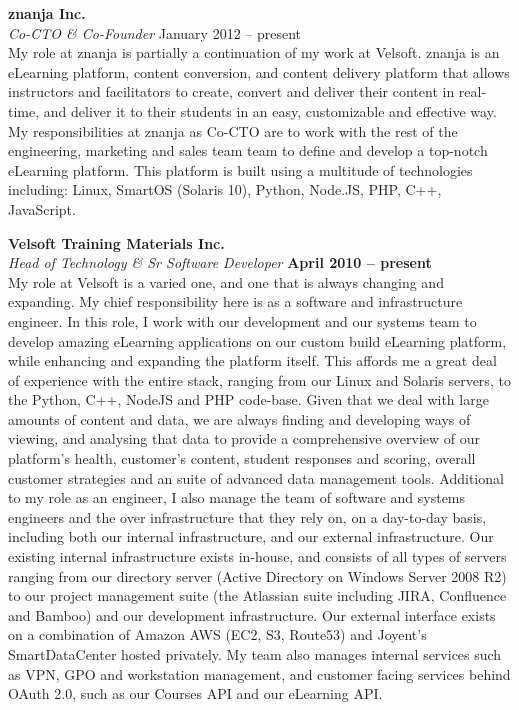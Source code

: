 \documentclass[margin,line]{resume}
\begin{document}
\begin{resume}
	{\bf znanja Inc.} \vspace{2mm}\\\vspace{1mm}
	{\sl Co-CTO \& Co-Founder} \hfill {January 2012 -- present}
	\\
		My role at znanja is partially a continuation of my work at Velsoft. znanja is an eLearning platform, content conversion, and content delivery platform that allows instructors and facilitators to create, convert and deliver their content in real-time, and deliver it to their students in an easy, customizable and effective way. My responsibilities at znanja as Co-CTO are to work with the rest of the engineering, marketing and sales team team to define and develop a top-notch eLearning platform. This platform is built using a multitude of technologies including: Linux, SmartOS (Solaris 10), Python, Node.JS, PHP, C++, JavaScript.

	{\bf Velsoft Training Materials Inc.} \vspace{2mm}\\\vspace{1mm}
	{\sl Head of Technology \& Sr Software Developer} \hfill {\bf April 2010 -- present}
	\\
		My role at Velsoft is a varied one, and one that is always changing and expanding. My chief responsibility here is as a software and infrastructure engineer. In this role, I work with our development and our systems team to develop amazing eLearning applications on our custom build eLearning platform, while enhancing and expanding the platform itself. This affords me a great deal of experience with the entire stack, ranging from our Linux and Solaris servers, to the Python, C++, NodeJS and PHP code-base. Given that we deal with large amounts of content and data, we are always finding and developing ways of viewing, and analysing that data to provide a comprehensive overview of our platform's health, customer's content, student responses and scoring, overall customer strategies and an suite of advanced data management tools.
\newpage
		Additional to my role as an engineer, I also manage the team of software and systems engineers and the over infrastructure that they rely on, on a day-to-day basis, including both our internal infrastructure, and our external infrastructure. Our existing internal infrastructure exists in-house, and consists of all types of servers ranging from our directory server (Active Directory on Windows Server 2008 R2) to our project management suite (the Atlassian suite including JIRA, Confluence and Bamboo) and our development infrastructure. Our external interface exists on a combination of Amazon AWS (EC2, S3, Route53) and Joyent's SmartDataCenter hosted privately. My team also manages internal services such as VPN, GPO and workstation management, and customer facing services behind OAuth 2.0, such as our Courses API and our eLearning API.


\end{resume}
\end{document}
